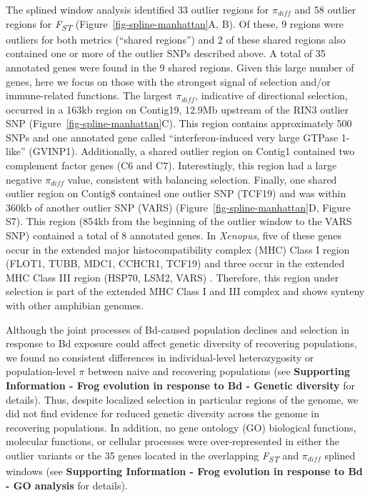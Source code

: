 \documentclass[9pt,twocolumn,twoside,lineno]{pnas-new}
\begin{document}
The splined window analysis identified 33 outlier regions for
\(\pi_{diff}\) and 58 outlier regions for \emph{F\textsubscript{ST}}
(Figure~\ref{fig-spline-manhattan}A, B). Of these, 9 regions were
outliers for both metrics (``shared regions'') and 2 of these shared
regions also contained one or more of the outlier SNPs described above.
A total of 35 annotated genes were found in the 9 shared regions. Given
this large number of genes, here we focus on those with the strongest
signal of selection and/or immune-related functions. The largest
\(\pi_{diff}\), indicative of directional selection, occurred in a 163kb
region on Contig19, 12.9Mb upstream of the RIN3 outlier SNP
(Figure~\ref{fig-spline-manhattan}C). This region contains
approximately 500 SNPs and one annotated gene called
``interferon-induced very large GTPase 1-like'' (GVINP1). Additionally,
a shared outlier region on Contig1 contained two complement factor genes
(C6 and C7). Interestingly, this region had a large negative
\(\pi_{diff}\) value, consistent with balancing selection. Finally, one
shared outlier region on Contig8 contained one outlier SNP (TCF19) and
was within 360kb of another outlier SNP (VARS)
(Figure~\ref{fig-spline-manhattan}D, Figure S7).
This region (854kb from the beginning of the outlier window to the VARS
SNP) contained a total of 8 annotated genes. In \emph{Xenopus}, five of
these genes occur in the extended major histocompatibility complex (MHC)
Class I region (FLOT1, TUBB, MDC1, CCHCR1, TCF19) and three occur in the
extended MHC Class III region (HSP70, LSM2, VARS) \citep{ohta2006}.
Therefore, this region under selection is part of the extended MHC Class
I and III complex and shows synteny with other amphibian genomes.

Although the joint processes of Bd-caused population declines and
selection in response to Bd exposure could affect genetic diversity of
recovering populations, we found no consistent differences in
individual-level heterozygosity or population-level \(\pi\) between
naive and recovering populations (see \textbf{Supporting Information -
Frog evolution in response to Bd - Genetic diversity} for details).
Thus, despite localized selection in particular regions of the genome,
we did not find evidence for reduced genetic diversity across the genome
in recovering populations. In addition, no gene ontology (GO) biological
functions, molecular functions, or cellular processes were
over-represented in either the outlier variants or the 35 genes located
in the overlapping \emph{F\textsubscript{ST}} and \(\pi_{diff}\) splined
windows (see \textbf{Supporting Information - Frog evolution in response
to Bd} \textbf{- GO analysis} for details).
\end{document}
